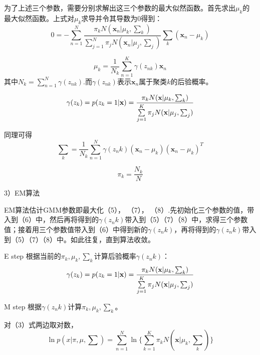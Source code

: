 \documentclass[bachelor]{ctexart}
\begin{document}
为了上述三个参数，需要分别求解出这三个参数的最大似然函数。首先求出$\mu_k$的最大似然函数。上式对$\mu_k$求导并令其导数为0得到：
\begin{equation}
0 = - \sum_{n=1}^{N}\frac{\pi_kN(\textbf{x}_n|\mu_k, {\sum}_k)}{\sum\limits_{j=1}^{N}\pi_jN(\textbf{x}_n|\mu_j, {\sum}_j)}{\sum}_k(\textbf{x}_n - \mu_k)
\end{equation}

\begin{equation}
\mu_k = \frac{1}{N_k}\sum_{n=1}^{K}\gamma(z_{nk})\textbf{x}_n
\end{equation}
其中$N_k = \sum_{n=1}^{N}\gamma(z_{nk})$.而$\gamma(z_{nk})$表示$\textbf{x}_n$属于聚类$k$的后验概率。

\begin{equation}
\gamma(z_k) = p(z_k = 1|\textbf{x})\\
 = \frac{\pi_k N(\textbf{x}|\mu_k, {\sum}_k)}{\sum\limits_{j = 1}^{K} \pi_j N(\textbf{x}|\mu_j, {\sum}_j)}
\end{equation}

同理可得
\begin{equation}
{\sum}_k = \frac{1}{N_k}\sum_{n=1}^{N}\gamma(z_nk)(\textbf{x}_n - \mu_k)(\textbf{x}_n - \mu_k)^T
\end{equation}

\begin{equation}
\pi_k = \frac{N_k}{N}
\end{equation}

3）EM算法

EM算法估计GMM参数即最大化（5）， （7）， （8）.先初始化三个参数的值，带入到（6）中，然后再将得到的$\gamma(z_nk)$带入到（5）（7）（8）中，求得三个参数值；接着用三个参数值带入到（6）中得到新的$\gamma(z_nk)$，再将得到的$\gamma(z_nk)$带入到（5）（7）（8）中。如此往复，直到算法收敛。

E step
根据当前的$\pi_k, \mu_k, {\sum}_k$计算后验概率$\gamma(z_nk)$：
\begin{equation}
\gamma(z_k) = p(z_k = 1|\textbf{x})\\
 = \frac{\pi_k N(\textbf{x}|\mu_k, {\sum}_k)}{\sum\limits_{j = 1}^{K} \pi_j N(\textbf{x}|\mu_j, {\sum}_j)}
\end{equation}

M step
根据$\gamma(z_nk)$计算$\pi_k, \mu_k, {\sum}_k$。

对（3）式两边取对数，
\begin{equation}
\ln p(x|\pi, \mu, \sum) = \sum_{n=1}^{N}\ln \{\sum_{k=1}^{K}\pi_k N(\textbf{x}|\mu_k, {\sum}_k)\}
\end{equation}
\end{document}
